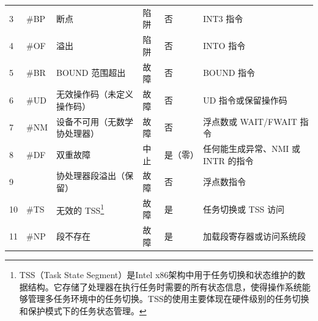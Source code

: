 \begin{longtable}[c]{@{}llllll@{}}
    3           & \#BP         & 断点                                                                                                                                                     & 陷阱          & 否             & INT3 指令                       \\
    4           & \#OF         & 溢出                                                                                                                                                     & 陷阱          & 否             & INTO 指令                       \\
    5           & \#BR         & BOUND 范围超出                                                                                                                                             & 故障          & 否             & BOUND 指令                      \\
    6           & \#UD         & 无效操作码（未定义操作码）                                                                                                                                          & 故障          & 否             & UD 指令或保留操作码                   \\
    7           & \#NM         & 设备不可用（无数学协处理器）                                                                                                                                         & 故障          & 否             & 浮点数或 WAIT/FWAIT 指令            \\
    8           & \#DF         & 双重故障                                                                                                                                                   & 中止          & 是（零）          & 任何能生成异常、NMI 或 INTR 的指令        \\
    9           &              & 协处理器段溢出（保留）                                                                                                                                            & 故障          & 否             & 浮点数指令                         \\
    10          & \#TS         & 无效的 TSS\footnote{TSS（Task State Segment）是Intel x86架构中用于任务切换和状态维护的数据结构。它存储了处理器在执行任务时需要的所有状态信息，使得操作系统能够管理多任务环境中的任务切换。TSS的使用主要体现在硬件级别的任务切换和保护模式下的任务状态管理。} & 故障          & 是             & 任务切换或 TSS 访问                  \\
    11          & \#NP         & 段不存在                                                                                                                                                   & 故障          & 是             & 加载段寄存器或访问系统段                  \\

\end{longtable}
